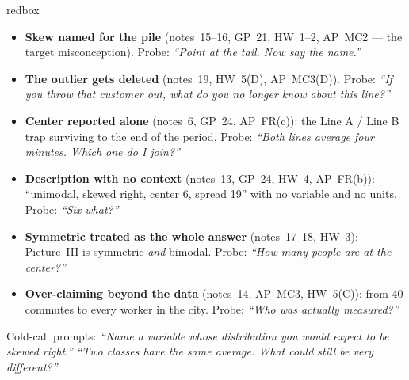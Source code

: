 \documentclass[10pt]{article}
\begin{document}
\boxguard
\begin{skillbox}{redbox}
\begin{itemize}[leftmargin=1.2em, nosep]
  \item \textbf{Skew named for the pile} (notes~15--16, GP~21, HW~1--2, AP~MC2 --- the target
        misconception). Probe: \emph{``Point at the tail. Now say the name.''}
  \item \textbf{The outlier gets deleted} (notes~19, HW~5(D), AP~MC3(D)). Probe:
        \emph{``If you throw that customer out, what do you no longer know about this line?''}
  \item \textbf{Center reported alone} (notes~6, GP~24, AP~FR(c)): the Line A / Line B trap
        surviving to the end of the period. Probe: \emph{``Both lines average four minutes.
        Which one do I join?''}
  \item \textbf{Description with no context} (notes~13, GP~24, HW~4, AP~FR(b)): ``unimodal,
        skewed right, center 6, spread 19'' with no variable and no units. Probe: \emph{``Six
        what?''}
  \item \textbf{Symmetric treated as the whole answer} (notes~17--18, HW~3): Picture~III is
        symmetric \emph{and} bimodal. Probe: \emph{``How many people are at the center?''}
  \item \textbf{Over-claiming beyond the data} (notes~14, AP~MC3, HW~5(C)): from 40 commutes to
        every worker in the city. Probe: \emph{``Who was actually measured?''}
\end{itemize}
Cold-call prompts: \emph{``Name a variable whose distribution you would expect to be skewed
right.''} \quad \emph{``Two classes have the same average. What could still be very different?''}
\end{skillbox}
\end{document}
